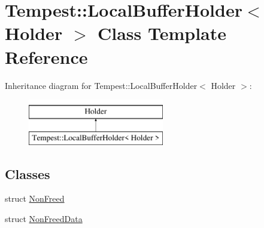 \hypertarget{class_tempest_1_1_local_buffer_holder}{\section{Tempest\+:\+:Local\+Buffer\+Holder$<$ Holder $>$ Class Template Reference}
\label{class_tempest_1_1_local_buffer_holder}
}
Inheritance diagram for Tempest\+:\+:Local\+Buffer\+Holder$<$ Holder $>$\+:\begin{figure}[H]
\begin{center}
\leavevmode
\includegraphics[height=2.000000cm]{class_tempest_1_1_local_buffer_holder}
\end{center}
\end{figure}
\subsection*{Classes}
\begin{DoxyCompactItemize}
\item 
struct \hyperlink{struct_tempest_1_1_local_buffer_holder_1_1_non_freed}{Non\+Freed}
\item 
struct \hyperlink{struct_tempest_1_1_local_buffer_holder_1_1_non_freed_data}{Non\+Freed\+Data}
\end{DoxyCompactItemize}
